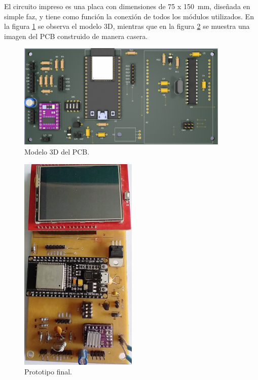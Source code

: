 El circuito impreso es una placa con dimensiones de 75 x 150~mm, diseñada en simple faz, y tiene como función la conexión de todos los módulos utilizados. En la figura \ref{fig:pcb3D} se observa el modelo 3D, mientras que en la figura \ref{fig:pcbPrototipo} se muestra una imagen del PCB construido de manera casera.


\begin{figure}[htbp]
	\centering
	\includegraphics[width=0.9\textwidth]{./Figures/pcb3D.png}
	\caption{Modelo 3D del PCB.}
	\label{fig:pcb3D}
\end{figure}

\begin{figure}[htbp]
	\centering
	\includegraphics[width=0.5\textwidth]{./Figures/pcbPrototipo.jpeg}
	\caption{Prototipo final.}
	\label{fig:pcbPrototipo}
\end{figure}

